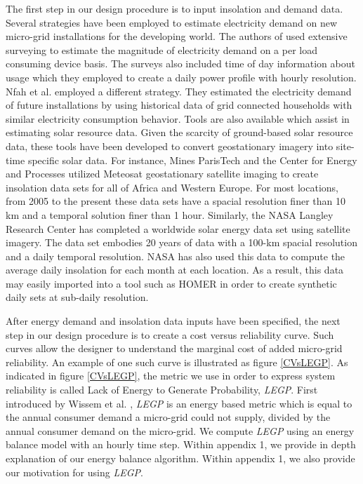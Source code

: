 \documentclass[11p]{article}
\begin{document}
The first step in our design procedure is to input insolation and demand data. 
Several strategies have been employed to estimate electricity demand on new micro-grid installations for the developing world. 
The authors of \cite{Camblong,Alzola} used extensive surveying to estimate the magnitude of electricity demand on a per load consuming device basis. 
The surveys also included time of day information about usage which they employed to create a daily power profile with hourly resolution. 
Nfah et al. \cite{Nfah} employed a different strategy.
They estimated the electricity demand of future installations by using historical data of grid connected households with similar electricity consumption behavior. 
Tools are also available which assist in estimating solar resource data.
Given the scarcity of ground-based solar resource data, these tools have been developed to convert geostationary imagery into site-time specific solar data. 
For instance, Mines ParisTech and the Center for Energy and Processes utilized Meteosat geostationary satellite imaging to create insolation data sets for all of Africa and Western Europe. 
For most locations, from 2005 to the present these data sets have a spacial resolution finer than 10 km and a temporal solution finer than 1 hour.  
Similarly, the NASA Langley Research Center has completed a worldwide solar energy data set using satellite imagery. 
The data set embodies 20 years of data with a 100-km spacial resolution and a daily temporal resolution.  
NASA has also used this data to compute the average daily insolation for each month at each location.
As a result, this data may easily imported into a tool such as HOMER in order to create synthetic daily sets at sub-daily resolution.   

After energy demand and insolation data inputs have been specified, the next step in our design procedure is to create a cost versus reliability curve. 
Such curves allow the designer to understand the marginal cost of added micro-grid reliability.
An example of one such curve is illustrated as figure \ref{CVsLEGP}.
As indicated in figure \ref{CVsLEGP}, the metric we use in order to express system reliability is called Lack of Energy to Generate Probability, \emph{LEGP}. 
First introduced by Wissem et al. \cite{Wissem}, \emph{LEGP} is an energy based metric which is equal to the annual consumer demand a micro-grid could not supply, divided by the annual consumer demand on the micro-grid.
We compute \emph{LEGP} using an energy balance model with an hourly time step. 
Within appendix 1, we provide in depth explanation of our energy balance algorithm.
Within appendix 1, we also provide our motivation for using \emph{LEGP}.
\end{document}
